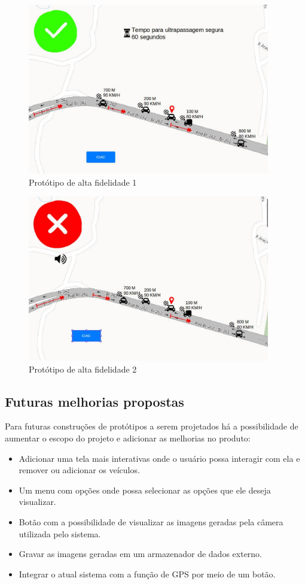 \begin{figure}[!h]
  \centering
  \includegraphics[width=400px, scale=1]{figuras/alta1}
  \caption{Protótipo de alta fidelidade 1}
\label{fig:alta1}
\end{figure}	

\begin{figure}[!h]
  \centering
  \includegraphics[width=400px, scale=1]{figuras/alta2}
  \caption{Protótipo de alta fidelidade 2}
\label{fig:alta2}
\end{figure}	

\subsection{Futuras melhorias propostas}

Para futuras construções de protótipos a serem projetados há a possibilidade de aumentar o escopo do projeto e adicionar as melhorias no produto:

\begin{itemize}
	\item Adicionar uma tela mais interativas onde o usuário possa interagir com ela e remover ou adicionar os veículos.
	\item Um menu com opções onde possa selecionar as opções que ele deseja visualizar.
	\item Botão com a possibilidade de visualizar as imagens geradas pela câmera utilizada pelo sistema.
	\item Gravar as imagens geradas em um armazenador de dados externo.
	\item Integrar o atual sistema com a função de GPS por meio de um botão.
\end{itemize}